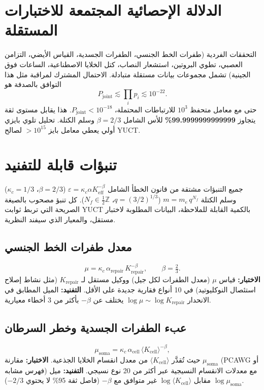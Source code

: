 \documentclass[11pt,a4paper]{article}
\begin{document}
	\section{الدلالة الإحصائية المجتمعة للاختبارات المستقلة}
	
	التحققات الفردية (طفرات الخط الجنسي، الطفرات الجسدية، القياس الأيضي، التزامن العصبي، تطوي البروتين، استشعار النصاب، كتل الخلايا الاصطناعية، الساعات فوق الجينية) تشمل مجموعات بيانات مستقلة متبادلة. الاحتمال المشترك لمراقبة مثل هذا التوافق بالصدفة هو
	\[
	P_{\text{joint}} \lesssim \prod_i p_i \lesssim 10^{-22}.
	\]
	حتى مع معامل متحفظ \(10^3\) للارتباطات المحتملة، \(P_{\text{joint}} < 10^{-18}\). هذا يقابل مستوى ثقة يتجاوز \textbf{99.9999999999999\%} للأس الشامل \(\beta=2/3\) وسلم الكتلة. تحليل تلوي بايزي أولي يعطي معامل بايز \(>10^{15}\) لصالح YUCT.
	
	\section{تنبؤات قابلة للتفنيد}
	
	جميع التنبؤات مشتقة من قانون الخطأ الشامل
	\(\varepsilon = \kappa_c \alpha K_{\mathrm{eff}}^{-\beta}\)
	(\(\beta=2/3\)، \(\kappa_c=1/3\)) وسلم الكتلة
	\(m = m_e\,q^{N_f}\) (\(q=(3/2)^{1/3}\)، \(N_f\in\tfrac12\mathbb{Z}\)).
	كل تنبؤ مصحوب بالصيغة الصريحة التي تربط ثوابت YUCT بالكمية القابلة للملاحظة، البيانات المطلوبة لاختبار مستقل، والمعيار الذي سيفند النظرية.
	
	\subsection{معدل طفرات الخط الجنسي}
	
	\begin{equation}\label{eq:pred-mutation}
		\mu = \kappa_c\,\alpha_{\mathrm{repair}}\,
		K_{\mathrm{repair}}^{-\beta}, \qquad \beta = \tfrac23 .
	\end{equation}
	\textbf{الاختبار:} قياس \(\mu\) (معدل الطفرات لكل جيل) ووكيل مستقل لـ \(K_{\mathrm{repair}}\) (مثل نشاط إصلاح استئصال النوكليوتيد) في 10 أنواع فقارية جديدة على الأقل.
	\textbf{التفنيد:} الميل المطابق في الانحدار
	\(\log\mu \sim \log K_{\mathrm{repair}}\) يختلف عن \(-\beta\) بأكثر من 3 أخطاء معيارية.
	
	\subsection{عبء الطفرات الجسدية وخطر السرطان}
	
	\begin{equation}\label{eq:pred-somatic}
		\mu_{\mathrm{soma}} = \kappa_c\,\alpha_{\mathrm{cell}}\,
		\langle K_{\mathrm{cell}}\rangle^{-\beta},
	\end{equation}
	حيث تُقدَّر \(\langle K_{\mathrm{cell}}\rangle\) من معدل انقسام الخلايا الجذعية.
	\textbf{الاختبار:} مقارنة \(\mu_{\mathrm{soma}}\) (PCAWG أو فهرس مشابه) مع معدلات الانقسام النسيجية عبر أكثر من 20 نوع نسيجي.
	\textbf{التفنيد:} ميل \(\log\mu_{\mathrm{soma}}\) مقابل \(\log\langle K_{\mathrm{cell}}\rangle\) غير متوافق مع \(-\beta\) (فاصل ثقة 95\% لا يحتوي \(-2/3\)).
	
\end{document}
